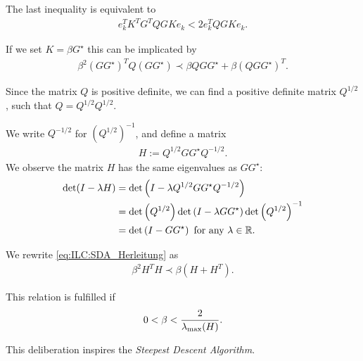 The last inequality is equivalent to 
\begin{align}
e_k^T K^T G^T Q GK e_k < 2 e_k^T Q GK e_k.
\end{align}

If we set $K = \beta G^{\star}$ this can be implicated by 
\begin{align}
\label{eq:ILC:SDA_Herleitung}
\beta^2 (G G^{\star})^T Q (G G^{\star}) \prec \beta Q G G^{\star} + \beta (Q G G^{\star})^T.
\end{align}

Since the matrix $Q$ is positive definite, we can find a positive definite 	 matrix $Q^{1/2}$, such that $Q = Q^{1/2}Q^{1/2}$. 

We write $Q^{-1/2}$ for $\left(Q^{1/2}\right)^{-1}$, and define a matrix 
\begin{align}
H :=  Q^{1/2} G G^\star Q^{-1/2}. 
\end{align}
We observe the matrix $H$ has the same eigenvalues as $G G^{\star}$: 
\begin{align}
\begin{split}
\det (I - \lambda H) &= \det \left(I - \lambda Q^{1/2} G G^\star Q^{-1/2}\right) \\
&= \det\left(Q^{1/2}\right)\det\left(I - \lambda G G^\star\right) \det\left(Q^{1/2}\right)^{-1} \\
&= \det\left(I - G G^\star\right) \text{ for any } \lambda \in {\mathbb{R}}. 
\end{split}
\end{align}

We rewrite \eqref{eq:ILC:SDA_Herleitung} as 
\begin{align}
\beta^2 H^T H \prec \beta (H + H^T). 
\end{align}

This relation is fulfilled if 
\begin{align}
0 < \beta < \frac{2}{\lambda_{\mathrm{max}}(H)}. 
\end{align}


This deliberation inspires the \textit{Steepest Descent Algorithm}. 

